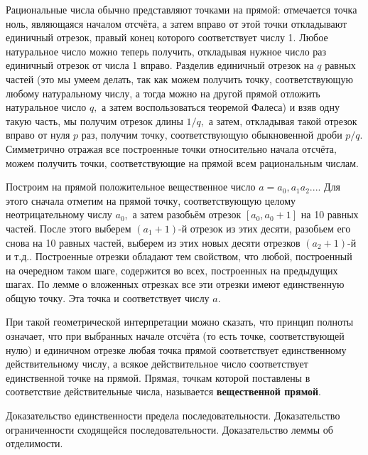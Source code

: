 Рациональные числа обычно представляют
точками на прямой: отмечается точка ноль,
являющаяся началом отсчёта, а затем
вправо от этой точки откладывают единичный
отрезок, правый конец которого соответствует
числу 1. Любое натуральное число можно
теперь получить, откладывая нужное
число раз единичный отрезок от числа 1
вправо. Разделив единичный отрезок
на $q$ равных частей
(это мы умеем делать, так как
можем получить точку, соответствующую
любому натуральному числу, а тогда можно
на другой прямой отложить натуральное число
$q,$ а затем
воспользоваться теоремой Фалеса) и взяв
одну такую часть, мы получим отрезок длины
$1/q,$ а затем, откладывая такой отрезок
вправо от нуля $p$ раз,
получим точку, соответствующую
обыкновенной дроби $p/q.$ Симметрично
отражая все построенные точки относительно
начала отсчёта, можем получить
точки, соответствующие на прямой
всем рациональным числам.

Построим
на прямой положительное вещественное число
$a=a_0,a_1a_2...$. Для этого сначала
отметим на прямой точку, соответствующую
целому неотрицательному числу $a_0,$ а
затем разобьём отрезок $[a_0, a_0+1]$
на 10 равных частей. После этого
выберем $(a_1+1)$-й отрезок из этих
десяти, разобьем его снова
на 10 равных частей, выберем из
этих новых десяти отрезков $(a_2+1)$-й и т.д..
Построенные отрезки обладают тем свойством,
что любой, построенный на очередном таком шаге,
содержится во всех, построенных на
предыдущих шагах. По лемме о вложенных
отрезках
все эти отрезки имеют единственную общую точку.
Эта точка и соответствует числу $a.$

При такой геометрической интерпретации
можно сказать, что принцип полноты
означает, что при выбранных начале
отсчёта (то есть точке,
соответствующей нулю) и единичном
отрезке любая точка прямой
соответствует единственному действительному
числу, а всякое действительное число
соответствует единственной точке на прямой.
Прямая, точкам которой
поставлены в соответствие действительные
числа, называется \textbf{вещественной прямой}.

\newpage
\begin{problem}
Доказательство единственности предела последовательности. Доказательство ограниченности сходящейся последовательности. Доказательство леммы об отделимости.
\end{problem}

